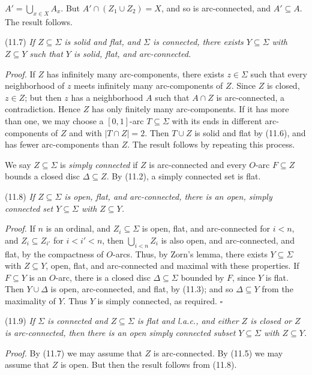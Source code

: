 \noindent $A' = \bigcup_{x \in X} A_x$. But $A' \cap (Z_1 \cup Z_2) = X$, and so is arc-connected, and $A' \subseteq A$. The result follows.

\stmt
(11.7) \textit{If $Z \subseteq \Sigma$ is solid and flat, and $\Sigma$ is connected, there exists $Y \subseteq \Sigma$ with $Z \subseteq Y$ such that $Y$ is solid, flat, and arc-connected.}

\textit{Proof.} If $Z$ has infinitely many arc-components, there exists $z \in \Sigma$ such that every neighborhood of $z$ meets infinitely many arc-components of $Z$. Since $Z$ is closed, $z \in Z$; but then $z$ has a neighborhood $A$ such that $A \cap Z$ is arc-connected, a contradiction. Hence $Z$ has only finitely many arc-components. If it has more than one, we may choose a $[0, 1]$-arc $T \subseteq \Sigma$ with its ends in different arc-components of $Z$ and with $|T \cap Z| = 2$. Then $T \cup Z$ is solid and flat by (11.6), and has fewer arc-components than $Z$. The result follows by repeating this process.

We say $Z \subseteq \Sigma$ is \textit{simply connected} if $Z$ is arc-connected and every $O$-arc $F \subseteq Z$ bounds a closed disc $\Delta \subseteq Z$. By (11.2), a simply connected set is flat.

\stmt
(11.8) \textit{If $Z \subseteq \Sigma$ is open, flat, and arc-connected, there is an open, simply connected set $Y \subseteq \Sigma$ with $Z \subseteq Y$.}

\textit{Proof.} If $n$ is an ordinal, and $Z_i \subseteq \Sigma$ is open, flat, and arc-connected for $i < n$, and $Z_i \subseteq Z_{i'}$ for $i < i' < n$, then $\bigcup_{i < n} Z_i$ is also open, and arc-connected, and flat, by the compactness of $O$-arcs. Thus, by Zorn's lemma, there exists $Y \subseteq \Sigma$ with $Z \subseteq Y$, open, flat, and arc-connected and maximal with these properties. If $F \subseteq Y$ is an $O$-arc, there is a closed disc $\Delta \subseteq \Sigma$ bounded by $F$, since $Y$ is flat. Then $Y \cup \Delta$ is open, arc-connected, and flat, by (11.3); and so $\Delta \subseteq Y$ from the maximality of $Y$. Thus $Y$ is simply connected, as required. $\square$

\stmt
(11.9) \textit{If $\Sigma$ is connected and $Z \subseteq \Sigma$ is flat and l.a.c., and either $Z$ is closed or $Z$ is arc-connected, then there is an open simply connected subset $Y \subseteq \Sigma$ with $Z \subseteq Y$.}

\textit{Proof.} By (11.7) we may assume that $Z$ is arc-connected. By (11.5) we may assume that $Z$ is open. But then the result follows from (11.8).

